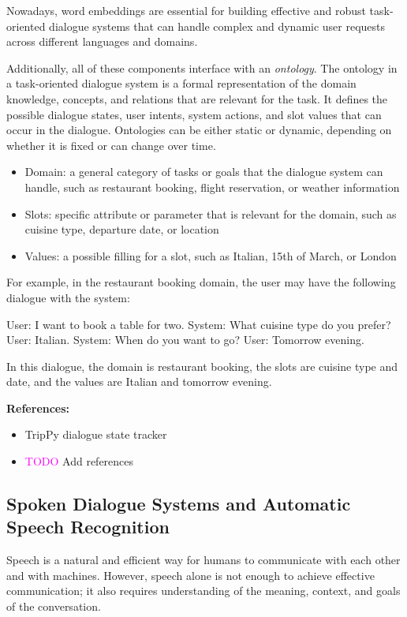 \documentclass[11pt, a4paper]{amsart}
\begin{document}
Nowadays, word embeddings are essential for building effective and robust task-oriented dialogue systems that can handle complex and dynamic user requests across different languages and domains.

Additionally, all of these components interface with an \emph{ontology}.
The ontology in a task-oriented dialogue system is a formal representation of the domain knowledge, concepts, and relations that are relevant for the task.
It defines the possible dialogue states, user intents, system actions, and slot values that can occur in the dialogue.
Ontologies can be either static or dynamic, depending on whether it is fixed or can change over time.

\begin{itemize}
	\item Domain: a general category of tasks or goals that the dialogue system can handle, such as restaurant booking, flight reservation, or weather information
	\item Slots: specific attribute or parameter that is relevant for the domain, such as cuisine type, departure date, or location
	\item Values: a possible filling for a slot, such as Italian, 15th of March, or London
\end{itemize}

For example, in the restaurant booking domain, the user may have the following dialogue with the system:

User: I want to book a table for two. System: What cuisine type do you prefer? User: Italian. System: When do you want to go? User: Tomorrow evening.

In this dialogue, the domain is restaurant booking, the slots are cuisine type and date, and the values are Italian and tomorrow evening.

\noindent \textbf{References:}
\begin{itemize}
	\item TripPy dialogue state tracker \cite{heck-etal-2020-trippy}
	\item \textcolor{magenta}{TODO} Add references
\end{itemize}

\subsection{Spoken Dialogue Systems and Automatic Speech Recognition}

Speech is a natural and efficient way for humans to communicate with each other and with machines.
However, speech alone is not enough to achieve effective communication; it also requires understanding of the meaning, context, and goals of the conversation.
\end{document}
